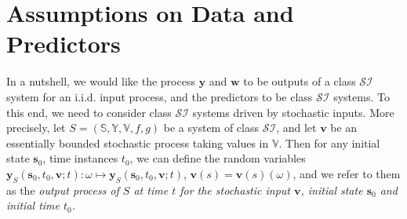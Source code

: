 \documentclass{ifacconf}
\newcommand{\train}{\mathcal{D}}
\def\rs{{\textnormal{s}}}
\def\rve{{\mathbf{e}}}
\def\rvs{{\mathbf{s}}}
\def\rvv{{\mathbf{v}}}
\def\rvw{{\mathbf{w}}}
\def\rvy{{\mathbf{y}}}
\def\vs{{\bm{s}}}
\def\vv{{\bm{v}}}
\def\sS{{\mathbb{S}}}
\def\sV{{\mathbb{V}}}
\def\sY{{\mathbb{Y}}}
\def\sZ{{\mathbb{Z}}}
\newcommand{\class}{\(\mathcal{SI}\)}
\begin{document}
\section{Assumptions on Data and Predictors}\label{sec:ProblemForm} 
\par
In a nutshell, 
we  would like the process $\rvy$ and $\rvw$ to be outputs of a class \class{} system for an i.i.d. input process, and the predictors to be class \class{}
systems.  To this end, we need to consider class \class{} systems driven by stochastic inputs.
More precisely, let $S=(\sS,\sY,\sV,f,g)$ be a system of class \class{}, and let $\rvv$ be an essentially bounded stochastic process taking values in $\sV$.
Then for any initial state 
$\vs_0$, time instances $t_0$, we can define the 
random variables 
$\rvy_S(\vs_0,t_0,\rvv;t):\omega\mapsto
\rvy_S(\vs_0,t_0,\vv;t)$, $\vv(s)=\rvv(s)(\omega)$, and
we refer to them 
as the  \emph{output process of $S$  at time $t$ 
for the stochastic input $\rvv$, initial state $\vs_0$ and initial time $t_0$.}
\end{document}
